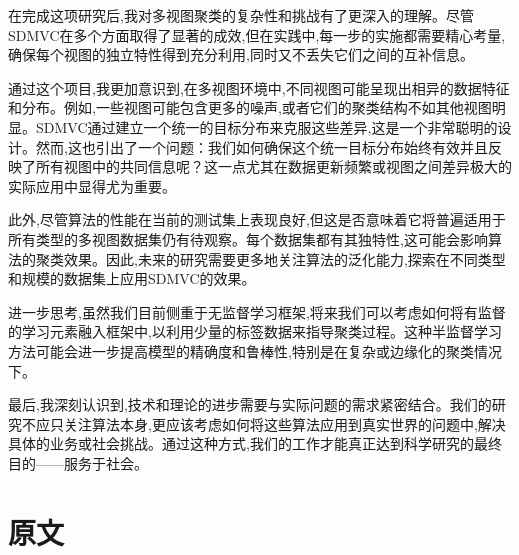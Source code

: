 \documentclass{article}
\begin{document}
在完成这项研究后,我对多视图聚类的复杂性和挑战有了更深入的理解。尽管SDMVC在多个方面取得了显著的成效,但在实践中,每一步的实施都需要精心考量,确保每个视图的独立特性得到充分利用,同时又不丢失它们之间的互补信息。

通过这个项目,我更加意识到,在多视图环境中,不同视图可能呈现出相异的数据特征和分布。例如,一些视图可能包含更多的噪声,或者它们的聚类结构不如其他视图明显。SDMVC通过建立一个统一的目标分布来克服这些差异,这是一个非常聪明的设计。然而,这也引出了一个问题：我们如何确保这个统一目标分布始终有效并且反映了所有视图中的共同信息呢？这一点尤其在数据更新频繁或视图之间差异极大的实际应用中显得尤为重要。

此外,尽管算法的性能在当前的测试集上表现良好,但这是否意味着它将普遍适用于所有类型的多视图数据集仍有待观察。每个数据集都有其独特性,这可能会影响算法的聚类效果。因此,未来的研究需要更多地关注算法的泛化能力,探索在不同类型和规模的数据集上应用SDMVC的效果。

进一步思考,虽然我们目前侧重于无监督学习框架,将来我们可以考虑如何将有监督的学习元素融入框架中,以利用少量的标签数据来指导聚类过程。这种半监督学习方法可能会进一步提高模型的精确度和鲁棒性,特别是在复杂或边缘化的聚类情况下。

最后,我深刻认识到,技术和理论的进步需要与实际问题的需求紧密结合。我们的研究不应只关注算法本身,更应该考虑如何将这些算法应用到真实世界的问题中,解决具体的业务或社会挑战。通过这种方式,我们的工作才能真正达到科学研究的最终目的——服务于社会。


\section{原文}

\end{document}
